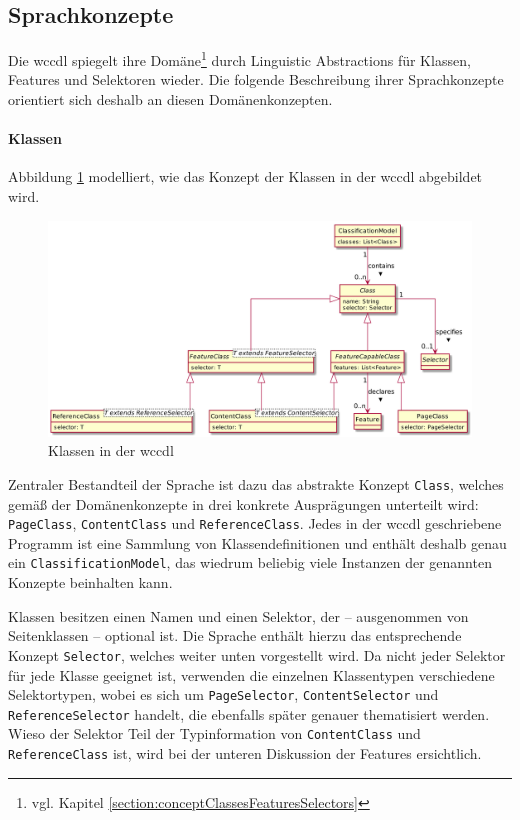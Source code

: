 \subsection{Sprachkonzepte}
    \label{solutionDetails:dslConcepts}
    Die \gls{wccdl} spiegelt ihre
    Domäne\footnote{vgl. Kapitel \ref{section:conceptClassesFeaturesSelectors}}
    durch Linguistic Abstractions für Klassen, Features und Selektoren wieder.
    Die folgende Beschreibung ihrer Sprachkonzepte orientiert sich deshalb an diesen
    Domänenkonzepten.
    
    \paragraph{Klassen}
    Abbildung \ref{image:dslClasses} modelliert,
    wie das Konzept der Klassen in der \gls{wccdl} abgebildet wird.

    \begin{figure}[htb]
        \centering
        \includegraphics[scale=\imageScalingFactor]{../resources/dsl/classes.png}
        \caption{Klassen in der \acrshort{wccdl}}
        \label{image:dslClasses}
    \end{figure}

    Zentraler Bestandteil der Sprache ist dazu das abstrakte Konzept \texttt{Class},
    welches gemäß der Domänenkonzepte in drei konkrete Ausprägungen unterteilt wird:
    \texttt{PageClass}, \texttt{ContentClass} und \texttt{ReferenceClass}.
    Jedes in der \gls{wccdl} geschriebene Programm ist eine Sammlung
    von Klassendefinitionen und enthält deshalb genau ein \texttt{ClassificationModel},
    das wiedrum beliebig viele Instanzen der genannten Konzepte beinhalten kann.

    Klassen besitzen einen Namen und einen Selektor,
    der -- ausgenommen von Seitenklassen -- optional ist.
    Die Sprache enthält hierzu das entsprechende Konzept \texttt{Selector},
    welches weiter unten vorgestellt wird.
    Da nicht jeder Selektor für jede Klasse geeignet ist,
    verwenden die einzelnen Klassentypen verschiedene Selektortypen,
    wobei es sich um \texttt{PageSelector}, \texttt{ContentSelector}
    und \texttt{ReferenceSelector} handelt,
    die ebenfalls später genauer thematisiert werden.
    Wieso der Selektor Teil der Typinformation von \texttt{ContentClass}
    und \texttt{ReferenceClass} ist,
    wird bei der unteren Diskussion der Features ersichtlich.


